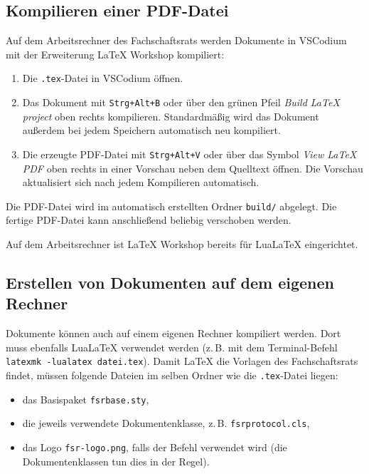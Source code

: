 
\subsection{Kompilieren einer PDF-Datei}
\label{latex-kompilieren}
Auf dem Arbeitsrechner des Fachschaftsrats werden Dokumente in VSCodium mit der Erweiterung LaTeX Workshop kompiliert:

\begin{enumerate}
	\item Die \texttt{.tex}-Datei in VSCodium öffnen.
	\item Das Dokument mit \texttt{Strg+Alt+B} oder über den grünen Pfeil \textit{Build LaTeX project} oben rechts kompilieren. Standardmäßig wird das Dokument außerdem bei jedem Speichern automatisch neu kompiliert.
	\item Die erzeugte PDF-Datei mit \texttt{Strg+Alt+V} oder über das Symbol \textit{View LaTeX PDF} oben rechts in einer Vorschau neben dem Quelltext öffnen. Die Vorschau aktualisiert sich nach jedem Kompilieren automatisch.
\end{enumerate}

Die PDF-Datei wird im automatisch erstellten Ordner \texttt{build/} abgelegt. Die fertige PDF-Datei kann anschließend beliebig verschoben werden.

Auf dem Arbeitsrechner ist LaTeX Workshop bereits für LuaLaTeX eingerichtet.

\subsection{Erstellen von Dokumenten auf dem eigenen Rechner}
\label{latex-eigener-rechner}
Dokumente können auch auf einem eigenen Rechner kompiliert werden. Dort muss ebenfalls LuaLaTeX verwendet werden (z.\,B. mit dem Terminal-Befehl \texttt{latexmk -lualatex datei.tex}). Damit \LaTeX{} die Vorlagen des Fachschaftsrats findet, müssen folgende Dateien im selben Ordner wie die \texttt{.tex}-Datei liegen:
\begin{itemize}
	\item das Basispaket \texttt{fsrbase.sty},
	\item die jeweils verwendete Dokumentenklasse, z.\,B. \texttt{fsrprotocol.cls},
	\item das Logo \texttt{fsr-logo.png}, falls der Befehl \texttt{\fsrlogo} verwendet wird (die Dokumentenklassen tun dies in der Regel).
\end{itemize}


